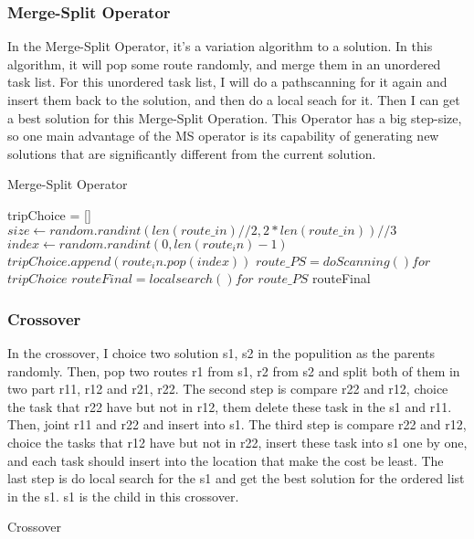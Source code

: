 \documentclass[conference,compsoc]{IEEEtran}
\begin{document}
    \subsubsection{Merge-Split Operator}
      In the Merge-Split Operator, it's a variation algorithm to a solution. In this algorithm, it will pop some route randomly, and merge them in an unordered task list.
      For this unordered task list, I will do a pathscanning for it again and insert them back to the solution, and then do a local seach for it. Then I can get a best solution for this Merge-Split Operation.
      This Operator has a big step-size, so one main advantage of the MS operator is its capability of generating new solutions that are significantly different from the current solution.  
      \begin{algorithm}
        \caption{Merge-Split Operator}
        \begin{algorithmic}[1]
            \State tripChoice = []
            \State $size \gets random.randint(len(route\_in)//2,2*len(route\_in))//3$
              \State $index\gets random.randint(0, len(route_in)-1)$
              \State $tripChoice.append(route_in.pop(index))$
            \EndFor
            \State $route\_PS = doScanning()for$ $tripChoice$
            \State $routeFinal = localsearch()for$ $route\_PS$
            \State \Return routeFinal
          \EndFunction
        \end{algorithmic}
      \end{algorithm}
    \subsubsection{Crossover}
    In the crossover, I choice two solution s1, s2 in the populition as the parents randomly. Then, pop two routes r1 from s1, r2 from s2 and split both of them in two part r11, r12 and r21, r22.
    The second step is compare r22 and r12, choice the task that r22 have but not in r12, them delete these task in the s1 and r11. Then, joint r11 and r22 and insert into s1.
    The third step is compare r22 and r12, choice the tasks that r12 have but not in r22, insert these task into s1 one by one, and each task should insert into the location that make the cost be least.
    The last step is do local search for the s1 and get the best solution for the ordered list in the s1. s1 is the child in this crossover.
    \begin{algorithm}
      \caption{Crossover}
      \begin{algorithmic}[1]
        
        \EndFunction
      \end{algorithmic}
    \end{algorithm}
\end{document}
